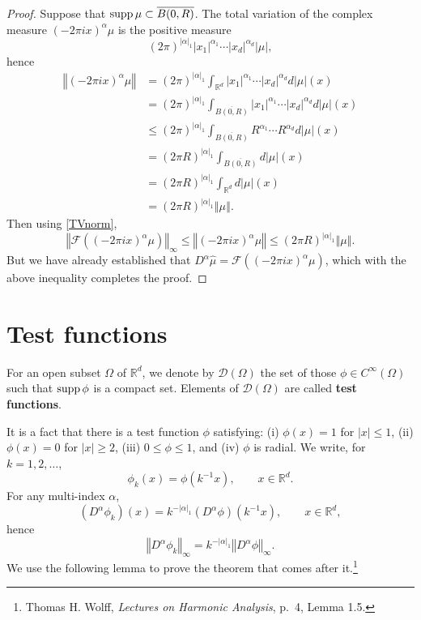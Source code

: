 \documentclass{article}
\newcommand{\supp}{\ensuremath\mathrm{supp}\,}
\newcommand{\norm}[1]{\left\Vert #1 \right\Vert}
\theoremstyle{definition}
\begin{document}
\begin{proof}
Suppose that $\supp \mu \subset \overline{B(0,R)}$. 
The total variation  of the complex measure $(-2\pi ix)^\alpha \mu$ is the positive measure
\[
(2\pi)^{|\alpha|_1} |x_1|^{\alpha_1} \cdots |x_d|^{\alpha_d} |\mu|,
\]
hence
\begin{align*}
\norm{(-2\pi ix)^\alpha \mu} &=(2\pi)^{|\alpha|_1} \int_{\mathbb{R}^d} |x_1|^{\alpha_1} \cdots |x_d|^{\alpha_d} d|\mu|(x)\\
&=(2\pi)^{|\alpha|_1} \int_{\overline{B(0,R)}} |x_1|^{\alpha_1} \cdots |x_d|^{\alpha_d} d|\mu|(x)\\
&\leq (2\pi)^{|\alpha|_1} \int_{\overline{B(0,R)}} R^{\alpha_1} \cdots R^{\alpha_d} d|\mu|(x)\\
&=(2\pi R)^{|\alpha|_1} \int_{\overline{B(0,R)}} d|\mu|(x)\\
&=(2\pi R)^{|\alpha|_1} \int_{\mathbb{R}^d} d|\mu|(x)\\
&=(2\pi R)^{|\alpha|_1} \norm{\mu}.
\end{align*}
Then using \eqref{TVnorm}, 
\[
\norm{\mathscr{F}((-2\pi ix)^\alpha \mu)}_\infty  \leq \norm{(-2\pi ix)^\alpha \mu} \leq (2\pi R)^{|\alpha|_1} \norm{\mu}.
\]
But we have already established that  $D^\alpha \hat{\mu} = \mathscr{F}((-2\pi ix)^\alpha \mu)$, which with the above inequality completes the proof.
\end{proof}


\section{Test functions}
For an open subset $\Omega$ of $\mathbb{R}^d$,  we denote by $\mathscr{D}(\Omega)$ the set of those
$\phi \in C^\infty(\Omega)$ such that $\supp \phi$ is a compact set. Elements of $\mathscr{D}(\Omega)$ are called
\textbf{test functions}.


It is a fact that there is a test function $\phi$ satisfying: (i) $\phi(x)=1$ for $|x| \leq 1$, (ii) $\phi(x)=0$ for $|x| \geq 2$,
(iii) $0 \leq \phi \leq 1$, and (iv) $\phi$ is radial. We write, for $k=1,2,\ldots$,
\[
\phi_k(x) = \phi(k^{-1} x), \qquad x \in \mathbb{R}^d.
\]
For any multi-index $\alpha$,
\[
(D^\alpha \phi_k)(x) = k^{-|\alpha|_1} (D^\alpha \phi)(k^{-1}x), \qquad x \in \mathbb{R}^d,
\]
hence 
\begin{equation}
\norm{D^\alpha \phi_k}_\infty = k^{-|\alpha|_1} \norm{D^\alpha \phi}_\infty.
\label{Dalpha}
\end{equation}
We use the following lemma to prove the theorem that comes after it.\footnote{Thomas H. Wolff, {\em Lectures on Harmonic Analysis}, p.~4, Lemma 1.5.}
\end{document}

